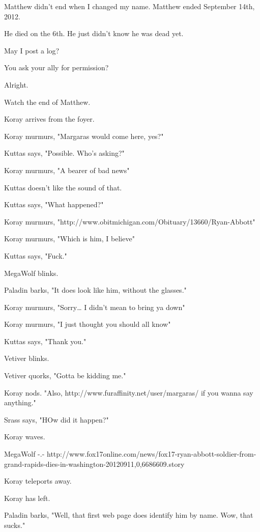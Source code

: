 \label{furry:margaras}
\noindent Matthew didn't end when I changed my name. Matthew ended September 14th, 2012.

\begin{ally}
He died on the 6th. He just didn't know he was dead yet.
\end{ally}
May I post a log?

\begin{ally}
You ask your ally for permission?
\end{ally}
Alright.

Watch the end of Matthew.
\newpage

\begin{hangparas}{2em}{1}
Koray arrives from the foyer.

Koray murmurs, "Margaras would come here, yes?"

Kuttas says, "Possible. Who's asking?"

Koray murmurs, "A bearer of bad news"

Kuttas doesn't like the sound of that.

Kuttas says, "What happened?"

Koray murmurs, "http://www.obitmichigan.com/Obituary/13660/Ryan-Abbott"

Koray murmurs, "Which is him, I believe"

Kuttas says, "Fuck."

MegaWolf blinks.

Paladin barks, "It does look like him, without the glasses."

Koray murmurs, "Sorry\ldots{} I didn't mean to bring ya down"

Koray murmurs, "I just thought you should all know"

Kuttas says, "Thank you."

Vetiver blinks.

Vetiver quorks, "Gotta be kidding me."

Koray nods. "Also, http://www.furaffinity.net/user/margaras/ if you wanna say anything."

Srass says, "HOw did it happen?"

Koray waves.

MegaWolf -.- http://www.fox17online.com/news/fox17-ryan-abbott-soldier-from-grand-rapids-dies-in-washington-20120911,0,6686609.story

Koray teleports away.

Koray has left.

Paladin barks, "Well, that first web page does identify him by name. Wow, that sucks."


\end{hangparas}
